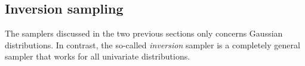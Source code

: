 \documentclass[twocolumn]{aa}
\renewcommand{\d}[0]{\vec{d}}
\newcommand{\x}[0]{\vec{x}}
\newcommand{\F}[0]{\tens{F}}
\newcommand{\T}[0]{\tens{T}}
\newcommand{\N}[0]{\tens{N}}
\newcommand{\I}[0]{\tens{I}}
\begin{document}





\subsection{Inversion sampling}
\label{sec:inversion}

The samplers discussed in the two previous sections only concerns
Gaussian distributions. In contrast, the so-called \emph{inversion}
sampler is a completely general sampler that works for all univariate
distributions. 
\end{document}
